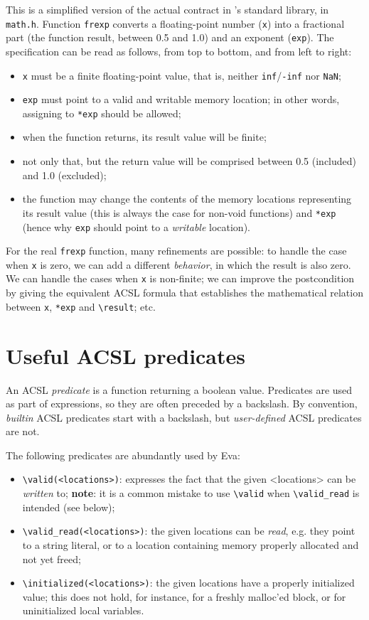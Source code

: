 \documentclass[web]{frama-c-book}
\newcommand{\Eva}{\textsf{Eva}}
\begin{document}
This is a simplified version of the actual contract in \FramaC's standard
library, in \texttt{math.h}. Function \texttt{frexp} converts a floating-point
number (\texttt{x}) into a fractional part (the function result, between
0.5 and 1.0) and an exponent (\texttt{exp}).
The specification can be read as follows, from top to bottom, and from left
to right:
\begin{itemize}
\item \texttt{x} must be a finite floating-point value, that is, neither
  \texttt{inf}/\texttt{-inf} nor \texttt{NaN};
\item \texttt{exp} must point to a valid and writable memory location;
  in other words, assigning to \texttt{*exp} should be allowed;
\item when the function returns, its result value will be finite;
\item not only that, but the return value will be comprised between
  0.5 (included) and 1.0 (excluded);
\item the function may change the contents of the memory locations representing
  its result value (this is always the case for non-void functions) and
  \texttt{*exp} (hence why \texttt{exp} should point to a {\em writable}
  location).
\end{itemize}

For the real \texttt{frexp} function, many refinements are possible: to handle
the case when \texttt{x} is zero, we can add a different {\em behavior},
in which the result is also zero. We can handle the cases when \texttt{x} is
non-finite; we can improve the postcondition by giving the equivalent ACSL
formula that establishes the mathematical relation between \texttt{x},
\texttt{*exp} and \verb+\result+; etc.

\section{Useful ACSL predicates}

An ACSL {\em predicate} is a function returning a boolean value.
Predicates are used as part of expressions, so they are often preceded
by a backslash. By convention, {\em builtin} ACSL predicates start with
a backslash, but {\em user-defined} ACSL predicates are not.

The following predicates are abundantly used by \Eva{}:
\begin{itemize}
\item \verb+\valid(<locations>)+: expresses the fact that
  the given <locations> can be {\em written} to; \textbf{note}: it is
  a common mistake to use \verb+\valid+ when \verb+\valid_read+ is intended
  (see below);
\item \verb+\valid_read(<locations>)+: the given locations can be {\em read},
  e.g. they point to a string literal, or to a location containing memory
  properly allocated and not yet freed;
\item \verb+\initialized(<locations>)+: the given locations have a properly
  initialized value; this does not hold, for instance, for a freshly
  malloc'ed block, or for uninitialized local variables.

\end{itemize}
\end{document}
